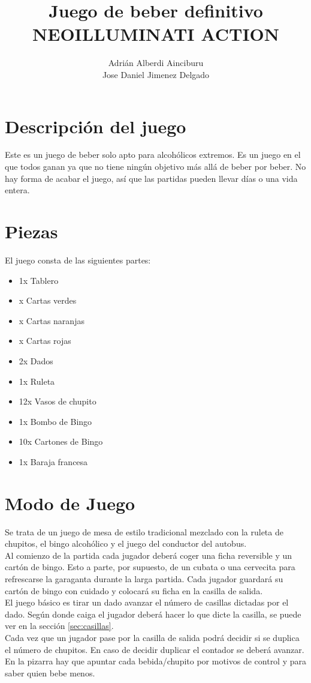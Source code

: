 \documentclass[10pt,a5paper]{article}
\title{\textbf{Juego de beber definitivo\\NEOILLUMINATI ACTION}}
\author{Adrián Alberdi Ainciburu\\
		Jose Daniel Jimenez Delgado}
\date{}
\begin{document}
\begin{titlepage}
\maketitle
\end{titlepage}

\section{Descripción del juego}
Este es un juego de beber solo apto para alcohólicos extremos. Es un juego en el que todos ganan ya que no tiene ningún objetivo más allá de beber por beber. No hay forma de acabar el juego, así que las partidas pueden llevar días o una vida entera.
\section{Piezas}
El juego consta de las siguientes partes:
\begin{itemize}
	\item 1x Tablero
	\item x Cartas verdes
	\item x Cartas naranjas
	\item x Cartas rojas
	\item 2x Dados
	\item 1x Ruleta
	\item 12x Vasos de chupito
	\item 1x Bombo de Bingo
	\item 10x Cartones de Bingo
	\item 1x Baraja francesa
\end{itemize}
\section{Modo de Juego}
Se trata de un juego de mesa de estilo tradicional mezclado con la ruleta de chupitos, el bingo alcohólico y el juego del conductor del autobus. \\
Al comienzo de la partida cada jugador deberá coger una ficha reversible y un cartón de bingo. Esto a parte, por supuesto, de un cubata o una cervecita para refrescarse la garaganta durante la larga partida. Cada jugador guardará su cartón de bingo con cuidado y colocará su ficha en la casilla de salida.\\
El juego básico es tirar un dado avanzar el número de casillas dictadas por el dado. Según donde caiga el jugador deberá hacer lo que dicte la casilla, se puede ver en la sección \ref{sec:casillas}.\\
Cada vez que un jugador pase por la casilla de salida podrá decidir si se duplica el número de chupitos. En caso de decidir duplicar el contador se deberá avanzar.\\
En la pizarra hay que apuntar cada bebida/chupito por motivos de control y para saber quien bebe menos.
\end{document}
